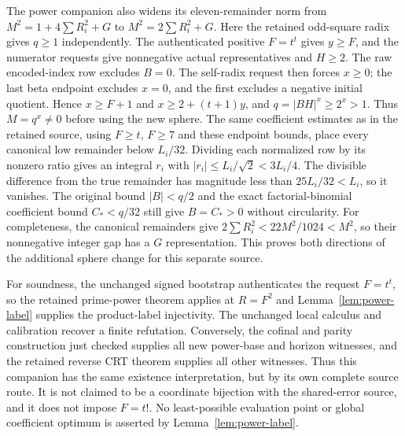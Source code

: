The power companion also widens its eleven-remainder norm from
$M^2=1+4\sum R_i^2+G$ to $M^2=2\sum R_i^2+G$.
Here the retained odd-square radix gives $q\ge1$ independently.
The authenticated positive $F=t^t$ gives $y\ge F$, and the numerator
requests give nonnegative actual representatives and $H\ge2$.
The raw encoded-index row excludes $B=0$. The self-radix request then
forces $x\ge0$; the last beta endpoint excludes $x=0$, and the first
excludes a negative initial quotient. Hence
$x\ge F+1$ and $x\ge2+(t+1)y$, and
$q=|BH|^x\ge2^x>1$. Thus $M=q^x\ne0$ before using the new sphere.
The same coefficient estimates as in the retained source, using
$F\ge t$, $F\ge7$ and these endpoint bounds, place every canonical
low remainder below $L_i/32$. Dividing each normalized row by its
nonzero ratio gives an integral $r_i$ with
$|r_i|\le L_i/\sqrt2<3L_i/4$. The divisible difference from the true
remainder has magnitude less than $25L_i/32<L_i$, so it vanishes.
The original bound $|B|<q/2$ and the exact factorial-binomial
coefficient bound $C_*<q/32$ still give $B=C_*>0$ without circularity.
For completeness, the canonical remainders give
$2\sum R_i^2<22M^2/1024<M^2$, so their nonnegative integer gap has a
$G$ representation. This proves both directions of the additional sphere
change for this separate source.

For soundness, the unchanged signed bootstrap authenticates the request
$F=t^t$, so the retained prime-power theorem applies at $R=F^2$ and
Lemma~\ref{lem:power-label} supplies the product-label injectivity.
The unchanged local calculus and calibration recover a finite refutation.
Conversely, the cofinal and parity construction just checked supplies all
new power-base and horizon witnesses, and the retained reverse CRT theorem
supplies all other witnesses. Thus this companion has the same existence
interpretation, but by its own complete source route. It is not claimed
to be a coordinate bijection with the shared-error source, and it does
not impose $F=t!$. No least-possible evaluation point or global
coefficient optimum is asserted by Lemma~\ref{lem:power-label}.
